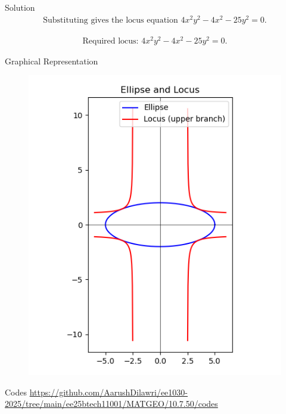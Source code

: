 \documentclass{beamer}
\begin{document}
\begin{frame}{Solution}
\begin{align}
\text{Substituting gives the locus equation }
4x^2y^2 - 4x^2 - 25y^2 = 0.
\end{align}

\begin{align}
\text{Required locus: } 4x^2y^2 - 4x^2 - 25y^2 = 0.
\end{align}
\end{frame}

\begin{frame}{Graphical Representation}
\begin{figure}[H]
\begin{center}
\includegraphics[width=0.6\columnwidth]{figs/fig.png}
\end{center}
\caption{}
\label{fig:Fig1}
\end{figure}
\end{frame}

\begin{frame}{Codes}
\url{https://github.com/AarushDilawri/ee1030-2025/tree/main/ee25btech11001/MATGEO/10.7.50/codes}
\end{frame}
\end{document}
